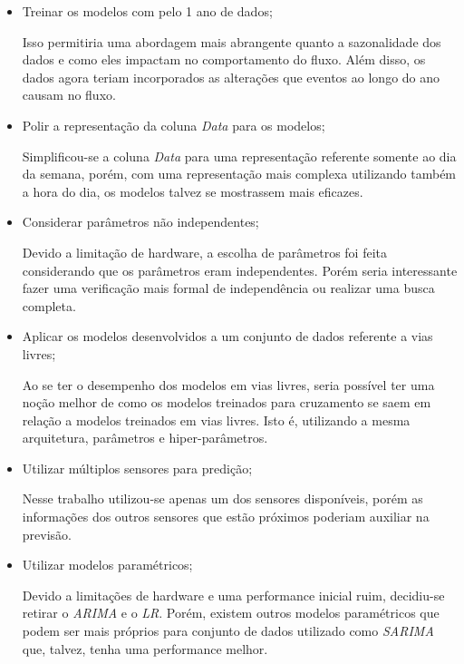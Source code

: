 \begin{itemize}
    \item Treinar os modelos com pelo 1 ano de dados;
    
    Isso permitiria uma abordagem mais abrangente quanto a sazonalidade dos dados e como eles impactam no comportamento do fluxo. Além disso, os dados agora teriam incorporados as alterações que eventos ao longo do ano causam no fluxo.
    
    \item Polir a representação da coluna  \textit{Data} para os modelos;
    
    Simplificou-se a coluna \textit{Data} para uma representação referente somente ao dia da semana, porém, com uma representação mais complexa utilizando também a hora do dia, os modelos talvez se mostrassem mais eficazes.
    
    \item Considerar parâmetros não independentes;
    
    Devido a limitação de hardware, a escolha de parâmetros foi feita considerando que os parâmetros eram independentes. Porém seria interessante fazer uma verificação mais formal de independência ou realizar uma busca completa.

    \item Aplicar os modelos desenvolvidos a um conjunto de dados referente a vias livres;
    
    Ao se ter o desempenho dos modelos em vias livres, seria possível ter uma noção melhor de como os modelos treinados para cruzamento se saem em relação a modelos treinados em vias livres. Isto é, utilizando a mesma arquitetura, parâmetros e hiper-parâmetros.
    
    \item Utilizar múltiplos sensores para predição;
    
    Nesse trabalho utilizou-se apenas um dos sensores disponíveis, porém as informações dos outros sensores que estão próximos poderiam auxiliar na previsão.
    
    \item Utilizar modelos paramétricos;
    
    Devido a limitações de hardware e uma performance inicial ruim, decidiu-se retirar o \textit{\acrfull{ARIMA}} e o \textit{\acrfull{LR}}. Porém, existem outros modelos paramétricos que podem ser mais próprios para conjunto de dados utilizado como \textit{\acrfull{SARIMA}} que, talvez, tenha uma performance melhor.
    

\end{itemize}
